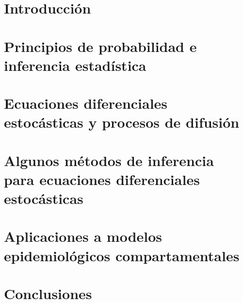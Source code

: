 \documentclass[letterpaper,12pt,spanish]{book}
\begin{document}

\maketitle %
\tableofcontents %
\markboth{}{}


%

\chapter*{Introducción}\label{cap:intro}
%

\chapter
{Principios de probabilidad e inferencia estadística}
\label{cap:01}


\chapter{Ecuaciones diferenciales estocásticas y procesos de difusión}
\label{cap:02}

%

\chapter[Algunos métodos de inferencia para EDEs]
{Algunos métodos de inferencia para ecuaciones diferenciales estocásticas}
\label{cap:03}


\chapter{Aplicaciones a modelos epidemiológicos compartamentales}
\label{cap:04}


\chapter{Conclusiones}
\label{cap:05}
%
%  
\printbibliography
\end{document}
